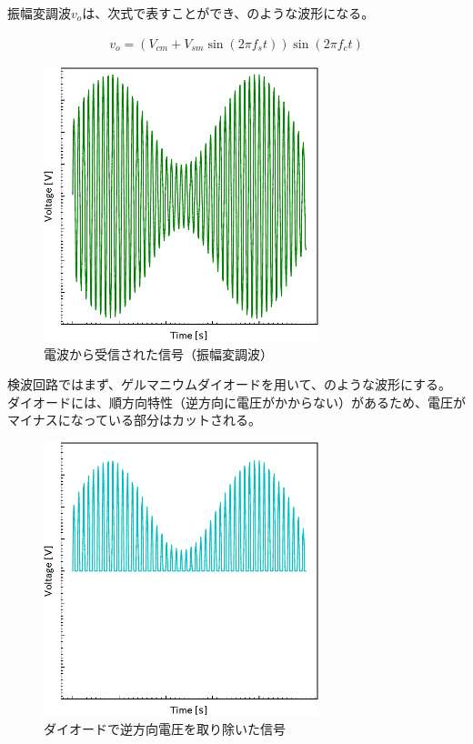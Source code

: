 \documentclass[report.tex]{subfiles}
\begin{document}
振幅変調波\(v_o\)は、次式で表すことができ、のような波形になる。

\begin{align}
	v_o = (V_{cm} + V_{sm} \sin(2 \pi f_s t)) \sin(2 \pi f_c t)
\end{align}

\begin{figure}[H]
	\centering
	\includegraphics[width=8cm]{fig/Wave.pdf}
	\caption{電波から受信された信号（振幅変調波）}
	\label{fig:wave}
\end{figure}

検波回路ではまず、ゲルマニウムダイオードを用いて、のような波形にする。
ダイオードには、順方向特性（逆方向に電圧がかからない）があるため、電圧がマイナスになっている部分はカットされる。

\begin{figure}[H]
	\centering
	\includegraphics[width=8cm]{fig/diode.pdf}
	\caption{ダイオードで逆方向電圧を取り除いた信号}
	\label{fig:diode}
\end{figure}
\end{document}
